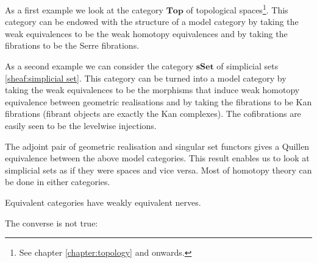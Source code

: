     \begin{example}
        As a first example we look at the category $\mathbf{Top}$ of topological spaces\footnote{See chapter \ref{chapter:topology} and onwards.}. This category can be endowed with the structure of a model category by taking the weak equivalences to be the weak homotopy equivalences and by taking the fibrations to be the Serre fibrations.
    \end{example}
    \begin{example}
        As a second example we can consider the category $\mathbf{sSet}$ of simplicial sets \ref{sheaf:simplicial set}. This category can be turned into a model category by taking the weak equivalences to be the morphisms that induce weak homotopy equivalence between geometric realisations and by taking the fibrations to be Kan fibrations (fibrant objects are exactly the Kan complexes). The cofibrations are easily seen to be the levelwise injections.
    \end{example}
    \begin{property}\label{cat:quillen_sset_top}
        The adjoint pair of geometric realisation and singular set functors gives a Quillen equivalence between the above model categories. This result enables us to look at simplicial sets as if they were spaces and vice versa. Most of homotopy theory can be done in either categories.
    \end{property}
    \begin{property}
        Equivalent categories have weakly equivalent nerves.
    \end{property}
    The converse is not true:

